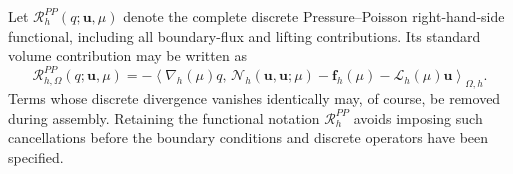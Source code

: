Let
$\mathscr{R}^{PP}_h(q;\boldsymbol{u},\mu)$ denote the complete discrete
Pressure--Poisson right-hand-side functional, including all boundary-flux
and lifting contributions.  Its standard volume contribution may be written
as
\begin{equation}
  \mathscr{R}^{PP}_{h,\Omega}
  (q;\boldsymbol{u},\mu)
  =
  -\left\langle
    \nabla_h(\mu)q,\,
    \mathcal{N}_{h}
     (\boldsymbol{u},\boldsymbol{u};\mu)
    -\boldsymbol{f}_{h}(\mu)
    -\mathcal{L}_{h}(\mu)\boldsymbol{u}
  \right\rangle_{\Omega,h}.
  \label{eq:pressure_poisson_weak_rhs}
\end{equation}
Terms whose discrete divergence vanishes identically may, of course, be
removed during assembly.  Retaining the functional notation
$\mathscr{R}^{PP}_h$ avoids imposing such cancellations before the boundary
conditions and discrete operators have been specified.

